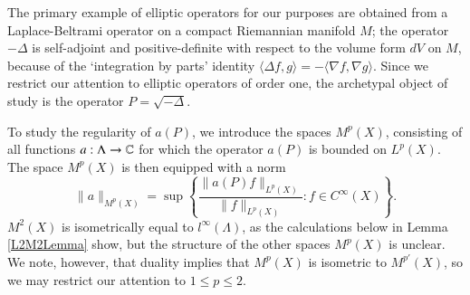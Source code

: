 %
%

The primary example of elliptic operators for our purposes are obtained from a Laplace-Beltrami operator on a compact Riemannian manifold $M$; the operator $-\Delta$ is self-adjoint and positive-definite with respect to the volume form $dV$ on $M$, because of the `integration by parts' identity $\langle \Delta f, g \rangle = - \langle \nabla f, \nabla g \rangle$. Since we restrict our attention to elliptic operators of order one, the archetypal object of study is the operator $P = \sqrt{-\Delta}$.

To study the regularity of $a(P)$, we introduce the spaces $M^p(X)$, consisting of all functions $a: \Lambda \to \operatorname{\mathbb{C}}$ for which the operator $a(P)$ is  bounded on $L^p(X)$. The space $M^p(X)$ is then equipped with a norm
%
\begin{equation}
  \| a \|_{M^p(X)} = \sup \left\{ \frac{\| a(P) f \|_{L^p(X)}}{\| f \|_{L^p(X)}} : f \in C^\infty(X) \right\}.
\end{equation}
%
$M^2(X)$ is isometrically equal to $l^\infty(\Lambda)$, as the calculations below in Lemma \ref{L2M2Lemma} show, but the structure of the other spaces $M^p(X)$ is unclear. We note, however, that duality implies that $M^p(X)$ is isometric to $M^{p'}(X)$, so we may restrict our attention to $1 \leq p \leq 2$.


